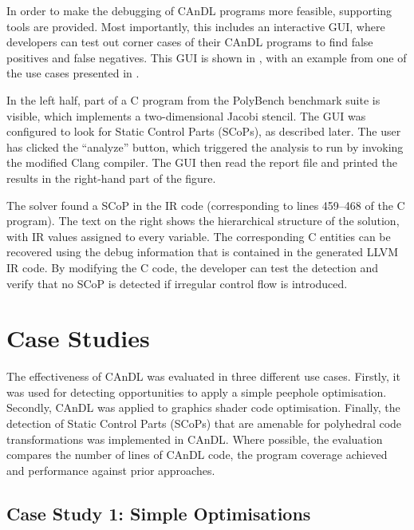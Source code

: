     In order to make the debugging of CAnDL programs more feasible, 
    supporting tools are provided.
    Most importantly, this includes an interactive GUI, where developers can
    test out corner cases of their CAnDL programs to find false positives and
    false negatives.
    This GUI is shown in , with an example from one of the use
    cases presented in .

    In the left half, part of a C program from the PolyBench benchmark suite
    is visible, which implements a two-dimensional Jacobi stencil.
    The GUI was configured to look for Static Control Parts (SCoPs), as
    described later.
    The user has clicked the ``analyze'' button, which triggered the analysis to
    run by invoking the modified Clang compiler.
    The GUI then read the report file and printed the results in the right-hand
    part of the figure.

    The solver found a SCoP in the IR code (corresponding to lines 459--468 of
    the C program).
    The text on the right shows the hierarchical structure of the solution, with
    IR values assigned to every variable.
    The corresponding C entities can be recovered using the debug information
    that is contained in the generated LLVM IR code.
    By modifying the C code, the developer can test the detection and verify
    that no SCoP is detected if irregular control flow is introduced.

\section{Case Studies}
\label{sec:casestudies}

    The effectiveness of CAnDL was evaluated in three different use cases.
    Firstly, it was used for detecting opportunities to apply a simple peephole
    optimisation.
    Secondly, CAnDL was applied to graphics shader code optimisation.
    Finally, the detection of Static Control Parts (SCoPs) that are
    amenable for polyhedral code transformations was implemented in CAnDL.
    Where possible, the evaluation compares the number of lines of CAnDL code,
    the program coverage achieved and performance against prior approaches.

\subsection{Case Study 1: Simple Optimisations}

